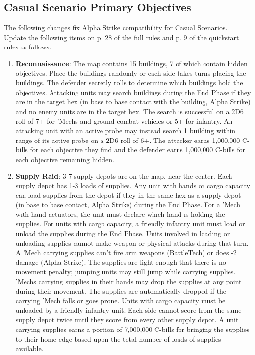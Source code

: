 \subsection{Casual Scenario Primary Objectives}

The following changes fix Alpha Strike compatibility for Casual Scenarios.
Update the following items on p. 28 of the full rules and p. 9 of the quickstart rules  as follows:

\begin{enumerate}

\item {\bfseries Reconnaissance}: The map contains 15 buildings, 7 of which contain hidden objectives.
Place the buildings randomly or each side takes turns placing the buildings.
The defender secretly rolls to determine which buildings hold the objectives.
Attacking units may search buildings during the End Phase if they are in the target hex (in base to base contact with the building, Alpha Strike) and no enemy units are in the target hex.
The search is successful on a 2D6 roll of 7+ for 'Mechs and ground combat vehicles or 5+ for infantry.
An attacking unit with an active probe may instead search 1 building within range of its active probe on a 2D6 roll of 6+.
The attacker earns 1,000,000 C-bills for each objective they find and the defender earns 1,000,000 C-bills for each objective remaining hidden.

\item {\bfseries Supply Raid}: 3-7 supply depots are on the map, near the center.
Each supply depot has 1-3 loads of supplies.
Any unit with hands or cargo capacity can load supplies from the depot if they in the same hex as a supply depot (in base to base contact, Alpha Strike) during the End Phase.
For a 'Mech with hand actuators, the unit must declare which hand is holding the supplies.
For units with cargo capacity, a friendly infantry unit must load or unload the supplies during the End Phase.
Units involved in loading or unloading supplies cannot make weapon or physical attacks during that turn.
A 'Mech carrying supplies can't fire arm weapons (BattleTech) or does -2 damage (Alpha Strike).
The supplies are light enough that there is no movement penalty; jumping units may still jump while carrying supplies.
'Mechs carrying supplies in their hands may drop the supplies at any point during their movement.
The supplies are automatically dropped if the carrying 'Mech falls or goes prone.
Units with cargo capacity must be unloaded by a friendly infantry unit.
Each side cannot score from the same supply depot twice until they score from every other supply depot.
A unit carrying supplies earns a portion of 7,000,000 C-bills for bringing the supplies to their home edge based upon the total number of loads of supplies available.


\end{enumerate}
